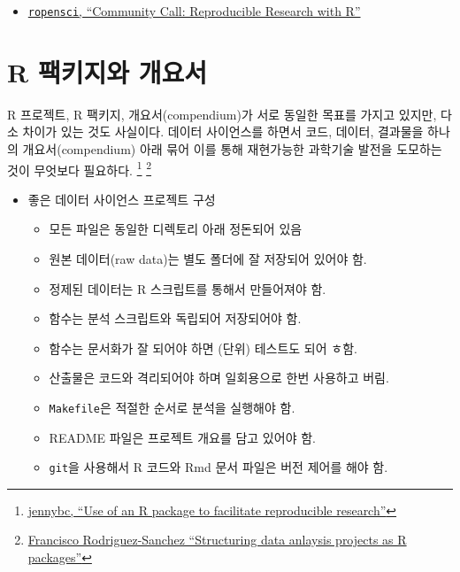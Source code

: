 \documentclass[
  letterpaper,
  chapter,a4paper,showtrims,openright,hidelinks]{oblivoir}
\providecommand{\tightlist}{%
  \setlength{\itemsep}{0pt}\setlength{\parskip}{0pt}}\usepackage{longtable,booktabs,array}
\begin{document}
\begin{itemize}
\tightlist
\item
  \href{https://ropensci.org/commcalls/2019-07-30/}{\texttt{ropensci},
  ``Community Call: Reproducible Research with R''}
\end{itemize}

\hypertarget{compendium-intro}{%
\section{R 팩키지와 개요서}\label{compendium-intro}}

R 프로젝트, R 팩키지, 개요서(compendium)가 서로 동일한 목표를 가지고
있지만, 다소 차이가 있는 것도 사실이다. 데이터 사이언스를 하면서 코드,
데이터, 결과물을 하나의 개요서(compendium) 아래 묶어 이를 통해
재현가능한 과학기술 발전을 도모하는 것이 무엇보다 필요하다. \footnote{\href{https://github.com/ropensci/rrrpkg}{jennybc,
  ``Use of an R package to facilitate reproducible research''}}
\footnote{\href{https://github.com/Pakillo/template/blob/master/slides/Projects_as_Packages.pdf}{Francisco
  Rodriguez-Sanchez ``Structuring data anlaysis projects as R
  packages''}}

\begin{itemize}
\tightlist
\item
  좋은 데이터 사이언스 프로젝트 구성

  \begin{itemize}
  \tightlist
  \item
    모든 파일은 동일한 디렉토리 아래 정돈되어 있음
  \item
    원본 데이터(raw data)는 별도 폴더에 잘 저장되어 있어야 함.
  \item
    정제된 데이터는 R 스크립트를 통해서 만들어져야 함.
  \item
    함수는 분석 스크립트와 독립되어 저장되어야 함.
  \item
    함수는 문서화가 잘 되어야 하면 (단위) 테스트도 되어 ㅎ함.
  \item
    산출물은 코드와 격리되어야 하며 일회용으로 한번 사용하고 버림.
  \item
    \texttt{Makefile}은 적절한 순서로 분석을 실행해야 함.
  \item
    README 파일은 프로젝트 개요를 담고 있어야 함.
  \item
    \texttt{git}을 사용해서 R 코드와 Rmd 문서 파일은 버전 제어를 해야
    함.
  \end{itemize}
\end{itemize}
\end{document}
